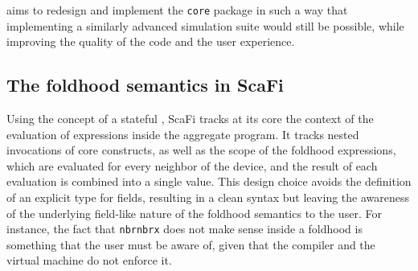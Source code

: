 \this aims to redesign and implement the \texttt{core} package in such a way that implementing a similarly advanced simulation suite would still be possible, while improving the quality of the code and the user experience.

\subsection{The foldhood semantics in ScaFi} \label{chap:analysis->sec:scafi-analysis->subsec:foldhood-semantics}

Using the concept of a stateful , ScaFi tracks at its core the context of the evaluation of expressions inside the aggregate program.
%
It tracks nested invocations of core constructs, as well as the scope of the foldhood expressions, which are evaluated for every neighbor of the device, and the result of each evaluation is combined into a single value.
%
This design choice avoids the definition of an explicit type for fields, resulting in a clean syntax but leaving the awareness of the underlying field-like nature of the foldhood semantics to the user.
%
For instance, the fact that \texttt{nbr{nbr{x}}} does not make sense inside a foldhood is something that the user must be aware of, given that the compiler and the virtual machine do not enforce it.
